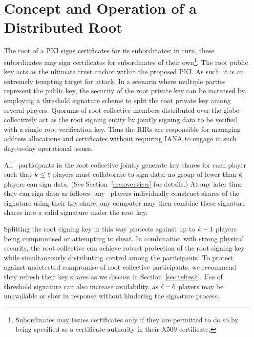 \section{Concept and Operation of a Distributed Root}
\label{sec:operation}

The root of a PKI signs certificates for its subordinates; in turn,
these subordinates may sign certificates for subordinates of their
own\footnote{Subordinates may issues certificates only if they are
permitted to do so by being specified as a certificate authority in
their X509 certificate.}. The root public key acts as the ultimate
trust anchor within the proposed PKI. As such, it is an extremely
tempting target for attack. In a scenario where multiple parties
represent the public key, the security of the root private key can be
increased by employing a threshold signature scheme to split the root
private key among several players. Quorums of root collective members
distributed over the globe collectively act as the root signing entity
by jointly signing data to be verified with a single root verification
key. Thus the RIRs are responsible for managing address allocations
and certificates without requiring IANA to engage in such day-to-day
operational issues.


All \nump\ participants in the root collective jointly generate key
shares for
 each player such that $k\leq \ell$ players must
collaborate to
 sign data; no group of fewer than $k$ players can
sign data. (See Section~\ref{sec:overview} for details.) At any later
time they can sign data as
 follows: any \nums\ players individually
construct shares of the
 signature using their key share; any
computer may then combine these
 signature shares into a valid
signature under the root key.

Splitting the root signing key in this way protects against up to
$k-1$ players being compromised or attempting to cheat. In
combination with strong physical security, the root collective can
achieve robust protection of the root signing key while simultaneously
distributing control among the participants. To protect against
undetected compromise of root collective participants, we recommend
they refresh their key shares as we discuss in
Section~\ref{sec:refresh}. Use of threshold signature can also
increase availability, as $\ell-k$ players may be unavailable or
slow in response without hindering the signature process.




